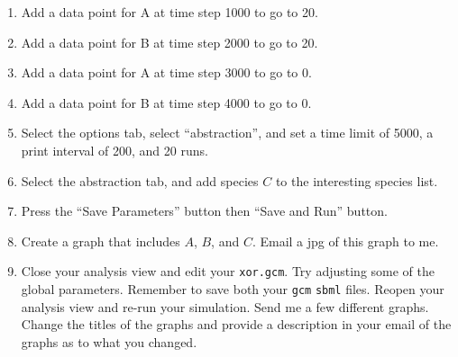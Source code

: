 \documentclass[titlepage,11pt]{article}
\begin{document}
\begin{enumerate}
\item Add a data point for A at time step 1000 to go to 20.

\item Add a data point for B at time step 2000 to go to 20.

\item Add a data point for A at time step 3000 to go to 0.

\item Add a data point for B at time step 4000 to go to 0.

\item Select the options tab, select ``abstraction'', and 
      set a time limit of 5000, a print interval of 200, and 20 runs.  

\item Select the abstraction tab, and add species $C$ to the interesting 
      species list.

\item Press the ``Save Parameters'' button then ``Save and Run'' button.

\item Create a graph that includes $A$, $B$, and $C$.  Email a jpg
      of this graph to me.

\item Close your analysis view and edit your {\tt xor.gcm}.  Try adjusting
      some of the global parameters.  Remember to save both your {\tt gcm}
      {\tt sbml} files.  Reopen your analysis view and re-run your simulation.
      Send me a few different graphs.  Change the titles of the graphs 
      and provide a description in your email of the graphs as to what you
      changed.
\end{enumerate}
  
\end{document}
